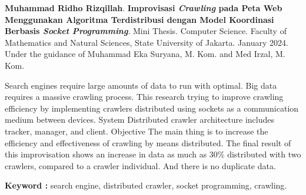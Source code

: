 \documentclass{jtetiskripsi}
\begin{document}
\begin{abstracteng}
	
	\textbf{Muhammad Ridho Rizqillah}. 	\textbf{Improvisasi \emph{Crawling} pada Peta Web Menggunakan
  Algoritma Terdistribusi dengan Model Koordinasi Berbasis
  \emph{Socket Programming}}. Mini Thesis. Computer Science. Faculty of Mathematics and Natural Sciences, State University of Jakarta. January 2024. Under the guidance of Muhammad Eka Suryana, M. Kom. and Med Irzal, M. Kom.
	\vskip5mm
	
	Search engines require large amounts of data to run with optimal. Big data requires a massive crawling process. This research trying to improve crawling efficiency by implementing crawlers distributed using sockets as a communication medium between devices. System Distributed crawler architecture includes tracker, manager, and client. Objective The main thing is to increase the efficiency and effectiveness of crawling by means distributed. The final result of this improvisation shows an increase in data as much as 30\% distributed with two crawlers, compared to a crawler individual. And there is no duplicate data.
	
	\bigskip
	\noindent
	\textbf{Keyword :} search engine, distributed crawler, socket programming, crawling.
\end{abstracteng}




\singlespacing{}
\tableofcontents{}
\listoffigures{}
\listoftables{}

\begin{counterpage}
\end{counterpage}
\onehalfspacing{}








% 
% 
\singlespacing{}
\printbibliography{}



\end{document}
